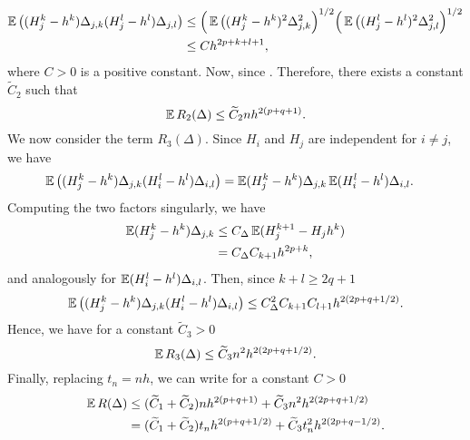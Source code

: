 \documentclass[10pt]{article}
\begin{document}
	\begin{equation}
	\begin{aligned}
		 \operatorname{\mathbb{E}} \big((H_j^k - h^k)\Delta_{j,k}(H_j^l - h^l) \Delta_{j,l}\big) &\leq \Big(\operatorname{\mathbb{E}} \big((H_j^k - h^k)^2\Delta_{j,k}^2\Big)^{1/2} \Big(\operatorname{\mathbb{E}} \big((H_j^l - h^l)^2\Delta_{j,l}^2\Big)^{1/2}\\
		 &\leq C h^{2p+k+l+1},
	\end{aligned}
	\end{equation}
	where $C > 0$ is a positive constant. Now, since . Therefore, there exists a constant $\tilde C_2$ such that
	\begin{equation}
		\operatorname{\mathbb{E}} R_2(\Delta) \leq \widetilde C_2 n h^{2(p+q+1)}.
	\end{equation}	
	We now consider the term $R_3(\Delta)$. Since $H_i$ and $H_j$ are independent for $i \neq j$, we have
	\begin{equation}
	\begin{aligned}
		\operatorname{\mathbb{E}} \big((H_j^k - h^k)\Delta_{j,k}(H_i^l - h^l) \Delta_{i,l}\big) &= \operatorname{\mathbb{E}} (H_j^k - h^k)\Delta_{j,k} \operatorname{\mathbb{E}} (H_i^l - h^l) \Delta_{i,l}.
	\end{aligned}
	\end{equation}
	Computing the two factors singularly, we have 
	\begin{equation}\label{eq:RemainderThirdBound}
	\begin{aligned}
		\operatorname{\mathbb{E}} (H_j^k - h^k)\Delta_{j,k} &\leq C_\Delta \operatorname{\mathbb{E}}(H_j^{k+1} - H_jh^k) \\
		&= C_\Delta C_{k+1} h^{2p+k},
	\end{aligned}
	\end{equation}
	and analogously for $\operatorname{\mathbb{E}} (H_i^l - h^l) \Delta_{i,l}$. Then, since $k+l \geq 2q+1$
	\begin{equation}\label{eq:RemainderFourthBound}
		\operatorname{\mathbb{E}} \big((H_j^k - h^k)\Delta_{j,k}(H_i^l - h^l) \Delta_{i,l}\big) \leq C_\Delta^2 C_{k+1} C_{l+1} h^{2(2p+q+1/2)}.
	\end{equation}
	Hence, we have for a constant $\tilde C_3 > 0$ 
	\begin{equation}
		\operatorname{\mathbb{E}} R_3(\Delta) \leq \widetilde C_3 n^2 h^{2(2p+q+1/2)}.
	\end{equation}
	Finally, replacing $t_n = nh$, we can write for a constant $C > 0$
	\begin{equation}
	\begin{aligned}
		\operatorname{\mathbb{E}} R(\Delta) &\leq (\widetilde C_1 + \widetilde C_2) n h^{2(p+q+1)} + \widetilde C_3 n^2 h^{2(2p+q+1/2)}\\
		&= (\widetilde C_1 + \widetilde C_2) t_n h^{2(p + q + 1/2)} + \widetilde C_3 t_n^2 h^{2(2p + q - 1/2)}.
	\end{aligned}
	\end{equation}
\end{document}
